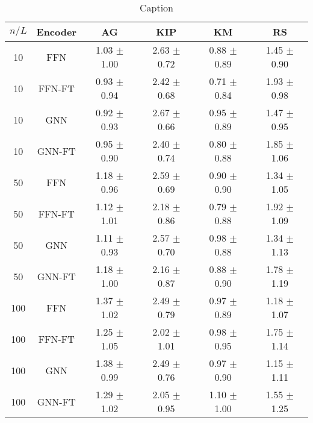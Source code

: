 \begin{table*}[]
	\centering
	{\small
	\begin{tabular}{cccccc}
		\toprule
		\textbf{$n/L$} & \textbf{Encoder} & \textbf{AG} & \textbf{KIP} & \textbf{KM} & \textbf{RS}\\ \midrule
		10 & FFN & 1.03 $\pm$ 1.00 & 2.63 $\pm$ 0.72 & 0.88 $\pm$ 0.89 & 1.45 $\pm$ 0.90\\
		10 & FFN-FT & 0.93 $\pm$ 0.94 & 2.42 $\pm$ 0.68 & 0.71 $\pm$ 0.84 & 1.93 $\pm$ 0.98\\
		10 & GNN & 0.92 $\pm$ 0.93 & 2.67 $\pm$ 0.66 & 0.95 $\pm$ 0.89 & 1.47 $\pm$ 0.95\\
		10 & GNN-FT & 0.95 $\pm$ 0.90 & 2.40 $\pm$ 0.74 & 0.80 $\pm$ 0.88 & 1.85 $\pm$ 1.06\\
		50 & FFN & 1.18 $\pm$ 0.96 & 2.59 $\pm$ 0.69 & 0.90 $\pm$ 0.90 & 1.34 $\pm$ 1.05\\
		50 & FFN-FT & 1.12 $\pm$ 1.01 & 2.18 $\pm$ 0.86 & 0.79 $\pm$ 0.88 & 1.92 $\pm$ 1.09\\
		50 & GNN & 1.11 $\pm$ 0.93 & 2.57 $\pm$ 0.70 & 0.98 $\pm$ 0.88 & 1.34 $\pm$ 1.13\\
		50 & GNN-FT & 1.18 $\pm$ 1.00 & 2.16 $\pm$ 0.87 & 0.88 $\pm$ 0.90 & 1.78 $\pm$ 1.19\\
		100 & FFN & 1.37 $\pm$ 1.02 & 2.49 $\pm$ 0.79 & 0.97 $\pm$ 0.89 & 1.18 $\pm$ 1.07\\
		100 & FFN-FT & 1.25 $\pm$ 1.05 & 2.02 $\pm$ 1.01 & 0.98 $\pm$ 0.95 & 1.75 $\pm$ 1.14\\
		100 & GNN & 1.38 $\pm$ 0.99 & 2.49 $\pm$ 0.76 & 0.97 $\pm$ 0.90 & 1.15 $\pm$ 1.11\\
		100 & GNN-FT & 1.29 $\pm$ 1.02 & 2.05 $\pm$ 0.95 & 1.10 $\pm$ 1.00 & 1.55 $\pm$ 1.25\\
		\bottomrule
	\end{tabular}
	}
	\caption{Caption}
	\label{my_label}
\end{table*}

